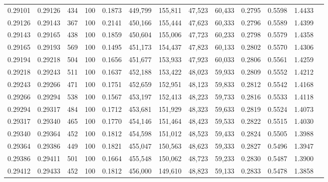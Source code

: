 \begin{tabular}{rrrrrrrrrrrrr}
0.29101 & 0.29126 &   434 & 100 &                                     0.1873 & 449,799 & 155,811 &  47,523 &  60,433 & 0.2795 & 0.5598 & 1.4433 \\
0.29126 & 0.29143 &   367 & 100 &                                     0.2141 & 450,166 & 155,444 &  47,623 &  60,333 & 0.2796 & 0.5589 & 1.4399 \\
0.29143 & 0.29165 &   438 & 100 &                                     0.1859 & 450,604 & 155,006 &  47,723 &  60,233 & 0.2798 & 0.5579 & 1.4358 \\
0.29165 & 0.29193 &   569 & 100 &                                     0.1495 & 451,173 & 154,437 &  47,823 &  60,133 & 0.2802 & 0.5570 & 1.4306 \\
0.29194 & 0.29218 &   504 & 100 &                                     0.1656 & 451,677 & 153,933 &  47,923 &  60,033 & 0.2806 & 0.5561 & 1.4259 \\
0.29218 & 0.29243 &   511 & 100 &                                     0.1637 & 452,188 & 153,422 &  48,023 &  59,933 & 0.2809 & 0.5552 & 1.4212 \\
0.29243 & 0.29266 &   471 & 100 &                                     0.1751 & 452,659 & 152,951 &  48,123 &  59,833 & 0.2812 & 0.5542 & 1.4168 \\
0.29266 & 0.29294 &   538 & 100 &                                     0.1567 & 453,197 & 152,413 &  48,223 &  59,733 & 0.2816 & 0.5533 & 1.4118 \\
0.29294 & 0.29317 &   484 & 100 &                                     0.1712 & 453,681 & 151,929 &  48,323 &  59,633 & 0.2819 & 0.5524 & 1.4073 \\
0.29317 & 0.29340 &   465 & 100 &                                     0.1770 & 454,146 & 151,464 &  48,423 &  59,533 & 0.2822 & 0.5515 & 1.4030 \\
0.29340 & 0.29364 &   452 & 100 &                                     0.1812 & 454,598 & 151,012 &  48,523 &  59,433 & 0.2824 & 0.5505 & 1.3988 \\
0.29364 & 0.29386 &   449 & 100 &                                     0.1821 & 455,047 & 150,563 &  48,623 &  59,333 & 0.2827 & 0.5496 & 1.3947 \\
0.29386 & 0.29411 &   501 & 100 &                                     0.1664 & 455,548 & 150,062 &  48,723 &  59,233 & 0.2830 & 0.5487 & 1.3900 \\
0.29412 & 0.29433 &   452 & 100 &                                     0.1812 & 456,000 & 149,610 &  48,823 &  59,133 & 0.2833 & 0.5478 & 1.3858 \\

\end{tabular}
